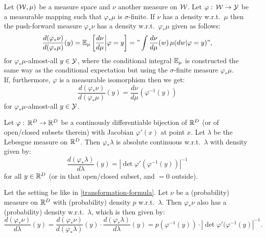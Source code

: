 \begin{Thm}
    Let $(\mathcal{W},\mu)$ be a  measure space and $\nu$ another measure on $\mathcal{W}$. Let $\varphi:\,\mathcal{W} \to \mathcal{Y}$ be a measurable mapping such that 
    $\varphi_*\mu$ is $\sigma$-finite.
    If $\nu$ has a density w.r.t.\ $\mu$ then the push-forward measure $\varphi_*\nu$ has a density w.r.t.\ $\varphi_*\mu$ given as follows:
    \[ \frac{d(\varphi_*\nu)}{d(\varphi_*\mu)}(y) = \mathbb{E}_\mu\left [ \frac{d\nu}{d\mu} \bigg| \varphi=y\right ]  = "\int \frac{d\nu}{d\mu}(w) \, \mu(dw|\varphi=y)", \]
    for $\varphi_*\mu$-almost-all $y \in \mathcal{Y}$,  where the conditional integral $\mathbb{E}_\mu$  is constructed 
    the same way as the conditional expectation but using the $\sigma$-finite measure $\varphi_*\mu$.\\
    If, furthermore, $\varphi$ is a measurable isomorphism then we get: 
    \[ \frac{d(\varphi_*\nu)}{d(\varphi_*\mu)}(y) = \frac{d\nu}{d\mu}(\varphi^{-1}(y)) \]
     for $\varphi_*\mu$-almost-all $y \in \mathcal{Y}$.
\end{Thm}

\begin{Thm}
    \label{transformation-formula}
    Let $\varphi:\, \mathbb{R}^D \to \mathbb{R}^D$ be a continously differentiable bijection of $\mathbb{R}^D$ (or of open/closed subsets therein) with Jacobian $\varphi'(x)$ at point $x$. 
    Let $\lambda$ be the Lebesgue measure on $\mathbb{R}^D$.
    Then $\varphi_* \lambda$ is absolute continuous w.r.t.\ $\lambda$ with density given by:
    \[ \frac{d (\varphi_*\lambda)}{d\lambda}(y) = | \det \varphi' (\varphi^{-1}(y))|^{-1}  \]
    for all $y \in \mathbb{R}^D$ (or in that open/closed subset, and $=0$ outside).
\end{Thm}


\begin{Cor}\label{lebesgue-density-transformation}
    Let the setting be like in \ref{transformation-formula}.
    Let $\nu$ be a (probability) measure on $\mathbb{R}^D$ with (probability) density $p$ w.r.t.\ $\lambda$.
    Then $\varphi_*\nu$ also has a (probability) density w.r.t.\ $\lambda$, which is then given by:
    \[ \frac{d(\varphi_*\nu)}{d\lambda}(y) = \frac{d(\varphi_*\nu)}{d(\varphi_*\lambda)}(y) \cdot \frac{d(\varphi_*\lambda)}{d\lambda}(y)  =  p(\varphi^{-1}(y)) \cdot |\det \varphi'(\varphi^{-1}(y)|^{-1}.   \]
\end{Cor}

